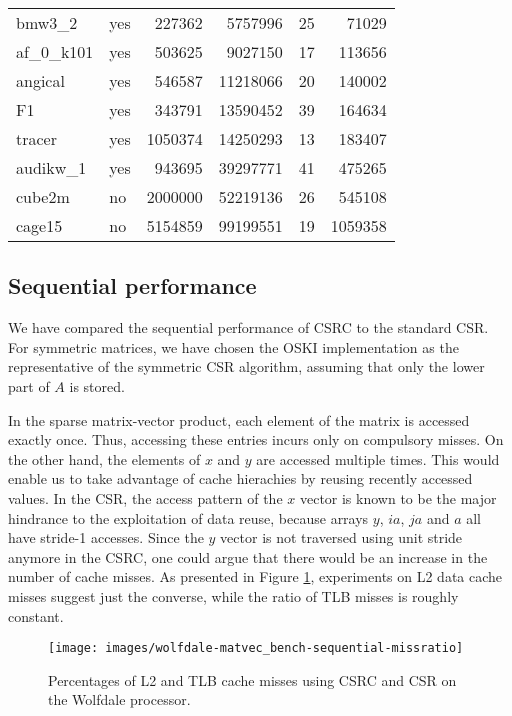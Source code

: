 \documentclass[11pt]{article}
\begin{document}
\begin{table}[!t]
{\begin{tabularx}{0.485\textwidth}{@{}l@{\ \ }l@{\ \ }r@{\ \ }r@{\ \ }r@{\ \ }r@{}}
bmw3\_2 & yes & 227362 & 5757996 & 25 & 71029 \\
af\_0\_k101 & yes & 503625 & 9027150 & 17 & 113656 \\
angical & yes & 546587 & 11218066 & 20 & 140002 \\
F1 & yes & 343791 & 13590452 & 39 & 164634 \\
tracer & yes & 1050374 & 14250293 & 13 & 183407 \\
audikw\_1 & yes & 943695 & 39297771 & 41 & 475265 \\
cube2m & no & 2000000 & 52219136 & 26 & 545108 \\
cage15 & no & 5154859 & 99199551 & 19 & 1059358 \\
\bottomrule
\end{tabularx}}
\end{table}

\subsection{Sequential performance}

We have compared the sequential performance of CSRC to the standard CSR.
For symmetric matrices, we have chosen the OSKI implementation \cite{LVDY04a}
as the representative of the symmetric CSR algorithm, assuming that only the
lower part of $A$ is stored.

In the sparse matrix-vector product, each element of the matrix is accessed
exactly once.  Thus, accessing these entries incurs only on compulsory misses.
On the other hand, the elements of $x$ and $y$ are accessed multiple times.
This would enable us to take advantage of cache hierachies by
reusing recently accessed values.  In the CSR, the access pattern of the $x$
vector is known to be the major hindrance to the exploitation of data reuse,
because arrays $y$, $ia$, $ja$ and $a$ all have stride-1 accesses. Since the
$y$ vector is not traversed using unit stride anymore in the CSRC, one could argue
that there would be an increase in the number of cache misses.  As
presented in Figure \ref{fig:missratio}, experiments on L2 data cache misses
suggest just the converse, while the ratio of TLB misses is roughly constant.

\begin{figure}[t]
\centering
\texttt{[image: images/wolfdale-matvec\_bench-sequential-missratio]}
\caption{Percentages of L2 and TLB cache misses
using CSRC and CSR on the
Wolfdale processor.}
\label{fig:missratio}
\end{figure}
\end{document}
